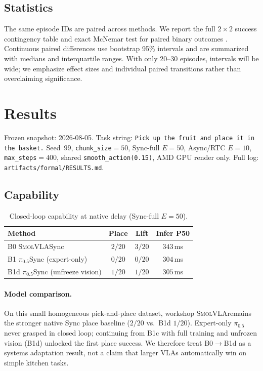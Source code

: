 \documentclass[10pt,twocolumn]{article}
\newcommand{\pifive}{$\pi_{0.5}$}
\newcommand{\smolvla}{\textsc{SmolVLA}}
\begin{document}
\subsection{Statistics}

The same episode IDs are paired across methods.  We report the full $2\times2$
success contingency table and exact McNemar test for paired binary outcomes
\cite{mcnemar1947}.  Continuous paired differences use bootstrap 95\%
intervals and are summarized with medians and interquartile ranges.  With only
20--30 episodes, intervals will be wide; we emphasize effect sizes and
individual paired transitions rather than overclaiming significance.

\section{Results}

Frozen snapshot: 2026-08-05. Task string:
\texttt{Pick up the fruit and place it in the basket.} Seed~$99$,
\texttt{chunk\_size}$=50$, Sync-full $E=50$, Async/RTC $E=10$,
\texttt{max\_steps}$=400$, shared \texttt{smooth\_action(0.15)}, AMD GPU
render only. Full log: \texttt{artifacts/formal/RESULTS.md}.

\subsection{Capability}

\begin{table}[t]
\centering
\caption{Closed-loop capability at native delay (Sync-full $E=50$).}
\label{tab:success}
\small
\begin{tabular}{lccc}
\toprule
Method & Place & Lift & Infer P50 \\
\midrule
B0 \smolvla Sync & $2/20$ & $3/20$ & $343$\,ms \\
B1 \pifive Sync (expert-only) & $0/20$ & $0/20$ & $304$\,ms \\
B1d \pifive Sync (unfreeze vision) & $1/20$ & $1/20$ & $305$\,ms \\
\bottomrule
\end{tabular}
\end{table}

\paragraph{Model comparison.}
On this small homogeneous pick-and-place dataset, workshop \smolvla remains
the stronger native Sync place baseline ($2/20$ vs.\ B1d $1/20$).
Expert-only \pifive never grasped in closed loop; continuing from B1c with full
training and unfrozen vision (B1d) unlocked the first place success. We
therefore treat B0$\rightarrow$B1d as a systems adaptation result, not a
claim that larger VLAs automatically win on simple kitchen tasks.
\end{document}
